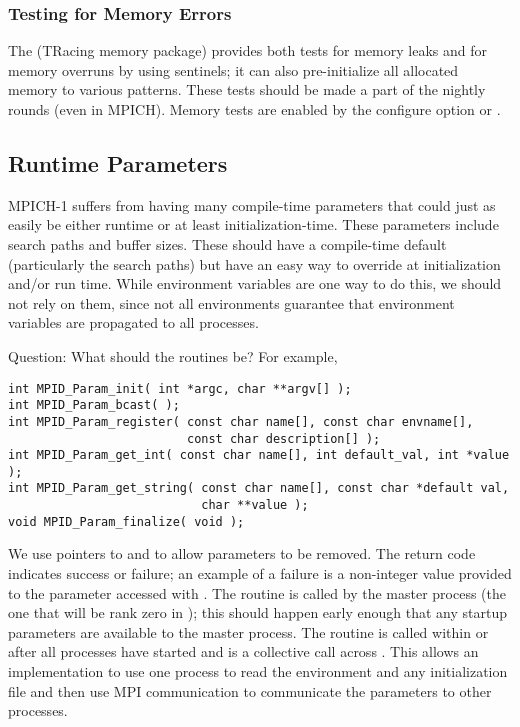 \documentclass{article}
\begin{document}
\subsubsection{Testing for Memory Errors}
The  (TRacing memory package) provides both tests for memory
leaks and for memory overruns by using sentinels; it can also
pre-initialize all allocated memory to various patterns.  These tests
should be made a part of the nightly rounds (even in MPICH).  
Memory tests are enabled by the configure option
 or .

\subsection{Runtime Parameters}
\label{sec:runtime-params}
MPICH-1 suffers from having many compile-time parameters that could just as
easily be either runtime or at least initialization-time.  These parameters
include search paths and buffer sizes.  These should have a compile-time
default (particularly the search paths) but have an easy way to override at
initialization and/or run time.  While environment variables are one way to do
this, we should not rely on them, since not all environments guarantee that
environment variables are propagated to all processes.

Question: What should the routines be?  For 
example,%
%
\begin{verbatim}
int MPID_Param_init( int *argc, char **argv[] );
int MPID_Param_bcast( );
int MPID_Param_register( const char name[], const char envname[], 
                         const char description[] );
int MPID_Param_get_int( const char name[], int default_val, int *value );
int MPID_Param_get_string( const char name[], const char *default val,
                           char **value );
void MPID_Param_finalize( void );
\end{verbatim}
We use pointers to  and  to allow parameters to be
removed.  The return code indicates success or failure; an example of a
failure is a non-integer value provided to the parameter accessed with
. 
The routine  is called by the master process (the one
that will be rank zero in ); this should happen early
enough that any startup parameters are available to the master process.  The
routine  is called within  or
 after all processes have started and is a collective
call across .  This allows an implementation to use one
process to read the environment and any initialization file and then use MPI
communication to communicate the parameters to other processes.  
\end{document}
